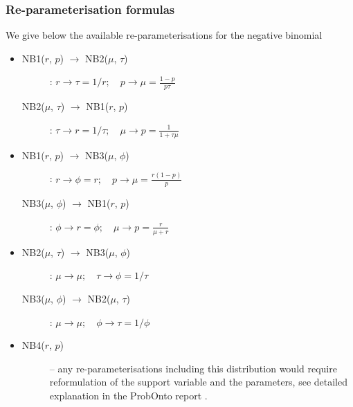 {\subsubsection{Re-parameterisation formulas}
We give below the available re-parameterisations for the negative binomial
\begin{itemize}
\item 
\begin{description}
\item[NB1($r$, $p$) $\rightarrow$ NB2($\mu$, $\tau$)]:
$r \rightarrow \tau = 1/r; \quad p \rightarrow \mu = \frac{1-p}{p\tau}$

\item[NB2($\mu$, $\tau$) $\rightarrow$ NB1($r$, $p$)]:
$\tau \rightarrow r=1/\tau; \quad \mu \rightarrow p = \frac{1}{1+\tau \mu}$
\end{description}

\item 
\begin{description}
\item[NB1($r$, $p$) $\rightarrow$ NB3($\mu$, $\phi$)]:
$r \rightarrow \phi=r; \quad p \rightarrow \mu=\frac{r (1-p)}{p}$

\item[NB3($\mu$, $\phi$) $\rightarrow$ NB1($r$, $p$)]:
$\phi \rightarrow r=\phi; \quad \mu \rightarrow p=\frac{r}{\mu+r}$
\end{description}

\item 
\begin{description}
\item[NB2($\mu$, $\tau$) $\rightarrow$ NB3($\mu$, $\phi$)]:
$\mu \rightarrow \mu; \quad \tau \rightarrow \phi=1/\tau$

\item[NB3($\mu$, $\phi$) $\rightarrow$ NB2($\mu$, $\tau$)]:
$\mu \rightarrow \mu; \quad \phi \rightarrow \tau=1/\phi$
\end{description}

\item 
\begin{description}
\item[NB4($r$, $p$)] -- any re-parameterisations including this distribution 
would require reformulation of the support variable and the parameters,
see detailed explanation in the ProbOnto report \cite{ProbOnto:2015a}. 
\end{description}

\end{itemize}



}
